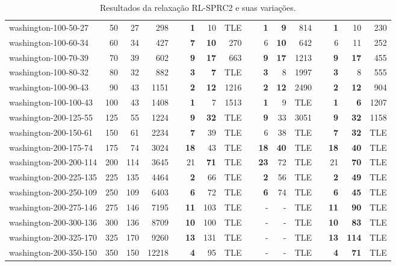 \begin{table}[!ht]
{\begin{tabular}{lrrrrrrrrrrrlrrr}
washington-100-50-27 & 50 & 27 & 298 &  & \textbf{1} & 10 & TLE &  & \textbf{1} & \textbf{9} & 814 &  & \textbf{1} & 10 & 230 \\
washington-100-60-34 & 60 & 34 & 427 &  & \textbf{7} & \textbf{10} & 270 &  & 6 & \textbf{10} & 642 &  & 6 & 11 & 252 \\
washington-100-70-39 & 70 & 39 & 602 &  & \textbf{9} & \textbf{17} & 663 &  & \textbf{9} & \textbf{17} & 1213 &  & \textbf{9} & \textbf{17} & 455 \\
washington-100-80-32 & 80 & 32 & 882 &  & \textbf{3} & \textbf{7} & TLE &  & \textbf{3} & 8 & 1997 &  & \textbf{3} & 8 & 555 \\
washington-100-90-43 & 90 & 43 & 1151 &  & \textbf{2} & \textbf{12} & 1216 &  & \textbf{2} & \textbf{12} & 2490 &  & \textbf{2} & \textbf{12} & 904 \\
washington-100-100-43 & 100 & 43 & 1408 &  & \textbf{1} & 7 & 1513 &  & \textbf{1} & 9 & TLE &  & \textbf{1} & \textbf{6} & 1207 \\ \hline
washington-200-125-55 & 125 & 55 & 1224 &  & \textbf{9} & \textbf{32} & TLE &  & \textbf{9} & 33 & 3051 &  & \textbf{9} & \textbf{32} & 1158 \\
washington-200-150-61 & 150 & 61 & 2234 &  & \textbf{7} & 39 & TLE &  & 6 & 38 & TLE &  & \textbf{7} & \textbf{32} & TLE \\
washington-200-175-74 & 175 & 74 & 3024 &  & \textbf{18} & 43 & TLE &  & \textbf{18} & \textbf{40} & TLE &  & \textbf{18} & \textbf{40} & TLE \\
washington-200-200-114 & 200 & 114 & 3645 &  & 21 & \textbf{71} & TLE &  & \textbf{23} & 72 & TLE &  & 21 & \textbf{70} & TLE \\
washington-200-225-135 & 225 & 135 & 4464 &  & \textbf{2} & 66 & TLE &  & \textbf{2} & 56 & TLE &  & \textbf{2} & \textbf{49} & TLE \\
washington-200-250-109 & 250 & 109 & 6403 &  & \textbf{6} & 72 & TLE &  & \textbf{6} & 74 & TLE &  & \textbf{6} & \textbf{45} & TLE \\
washington-200-275-146 & 275 & 146 & 7195 &  & \textbf{11} & 103 & TLE &  & - & - & TLE &  & \textbf{11} & \textbf{90} & TLE \\
washington-200-300-136 & 300 & 136 & 8709 &  & \textbf{10} & 100 & TLE &  & - & - & TLE &  & \textbf{10} & \textbf{83} & TLE \\
washington-200-325-170 & 325 & 170 & 9260 &  & \textbf{13} & 131 & TLE &  & - & - & TLE &  & \textbf{13} & \textbf{114} & TLE \\
washington-200-350-150 & 350 & 150 & 12218 &  & \textbf{4} & 95 & TLE &  & - & - & TLE &  & \textbf{4} & \textbf{71} & TLE \\ \hline
\end{tabular}%
}
\caption{Resultados da relaxação RL-SPRC2 e suas variações.}
\label{tab:rl-sprc2}
\end{table}

